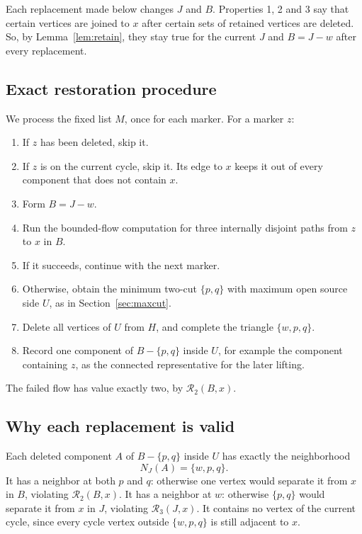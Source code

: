 \documentclass[11pt]{article}
\newcommand{\cR}{\mathcal R}
\begin{document}
Each replacement made below changes $J$ and $B$. Properties 1, 2 and 3 say that
certain vertices are joined to $x$ after certain sets of retained vertices are
deleted. So, by Lemma~\ref{lem:retain}, they stay true for the current $J$ and
$B=J-w$ after every replacement.

\subsection{Exact restoration procedure}\label{sec:restore}

We process the fixed list $M$, once for each marker. For a marker $z$:
\begin{enumerate}[nosep]
\item If $z$ has been deleted, skip it.
\item If $z$ is on the current cycle, skip it. Its edge to $x$ keeps it out of
every component that does not contain $x$.
\item Form $B=J-w$.
\item Run the bounded-flow computation for three internally disjoint paths
from $z$ to $x$ in $B$.
\item If it succeeds, continue with the next marker.
\item Otherwise, obtain the minimum two-cut $\{p,q\}$ with maximum open source
side $U$, as in Section~\ref{sec:maxcut}.
\item Delete all vertices of $U$ from $H$, and complete the triangle
$\{w,p,q\}$.
\item Record one component of $B-\{p,q\}$ inside $U$, for example the
component containing $z$, as the connected representative for the later
lifting.
\end{enumerate}

The failed flow has value exactly two, by $\cR_2(B,x)$.

\subsection{Why each replacement is valid}\label{sec:valid}

Each deleted component $A$ of $B-\{p,q\}$ inside $U$ has exactly the
neighborhood
\begin{equation*}
N_J(A)=\{w,p,q\}.
\end{equation*}
It has a neighbor at both $p$ and $q$: otherwise one vertex would separate it
from $x$ in $B$, violating $\cR_2(B,x)$. It has a neighbor at $w$: otherwise
$\{p,q\}$ would separate it from $x$ in $J$, violating $\cR_3(J,x)$. It
contains no vertex of the current cycle, since every cycle vertex outside
$\{w,p,q\}$ is still adjacent to $x$.
\end{document}
